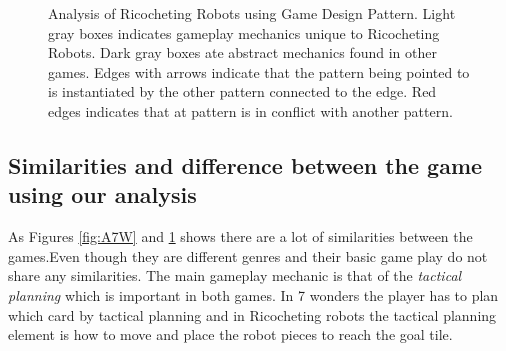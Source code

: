\documentclass[a4paper]{article}
\begin{document}
\begin{figure}[htb]

  \caption{Analysis of Ricocheting Robots using Game Design Pattern. Light gray boxes indicates gameplay mechanics unique to Ricocheting Robots. Dark gray boxes ate abstract mechanics found in other games. Edges with arrows indicate that the pattern being pointed to is instantiated by the other pattern connected to the edge. Red edges indicates that at pattern is in conflict with another pattern.} 
  \label{fig:RRW}
\end{figure}


\subsection{Similarities and difference between the game using our analysis}
  As Figures \ref{fig:A7W} and \ref{fig:RRW} shows there are a lot of similarities between the games.Even though they are different genres and their basic game play do not share any similarities. The main gameplay mechanic is that of the \textit{tactical planning} which is important in both games. In 7 wonders the player has to plan which card by tactical planning and in Ricocheting robots the tactical planning element is how to move and place the robot pieces to reach the goal tile. 
\end{document}
